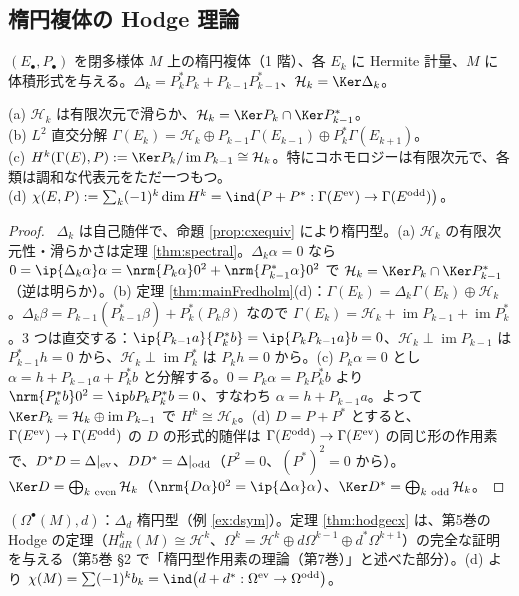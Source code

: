 \subsection{楕円複体の Hodge 理論}
$(E_\bullet,P_\bullet)$ を閉多様体 $M$ 上の楕円複体（1 階）、各 $E_k$ に Hermite 計量、$M$ に体積形式を与える。$\Delta_k=P_k^*P_k+P_{k-1}P_{k-1}^*$、$\mathcal H_k=\Ker\Delta_k$。
\begin{thm}\label{thm:hodgecx}
(a) $\mathcal H_k$ は有限次元で滑らか、$\mathcal H_k=\Ker P_k\cap\Ker P_{k-1}^*$。\\
(b) $L^2$ 直交分解 $\Gamma(E_k)=\mathcal H_k\oplus P_{k-1}\Gamma(E_{k-1})\oplus P_k^*\Gamma(E_{k+1})$。\\
(c) $H^k(\Gamma(E),P):=\Ker P_k/\operatorname{im}P_{k-1}\cong\mathcal H_k$。特にコホモロジーは有限次元で、各類は調和な代表元をただ一つもつ。\\
(d) $\chi(E,P):=\sum_k(-1)^k\dim H^k=\ind\bigl(P+P^*:\Gamma(E^{\rm ev})\to\Gamma(E^{\rm odd})\bigr)$。
\end{thm}
\begin{proof}
\tP\ $\Delta_k$ は自己随伴で、命題 \ref{prop:cxequiv} により楕円型。(a) $\mathcal H_k$ の有限次元性・滑らかさは定理 \ref{thm:spectral}。$\Delta_k\alpha=0$ なら $0=\ip{\Delta_k\alpha}\alpha=\nrm{P_k\alpha}0^2+\nrm{P_{k-1}^*\alpha}0^2$ で $\mathcal H_k=\Ker P_k\cap\Ker P_{k-1}^*$（逆は明らか）。(b) 定理 \ref{thm:mainFredholm}(d)：$\Gamma(E_k)=\Delta_k\Gamma(E_k)\oplus\mathcal H_k$。$\Delta_k\beta=P_{k-1}(P_{k-1}^*\beta)+P_k^*(P_k\beta)$ なので $\Gamma(E_k)=\mathcal H_k+\operatorname{im}P_{k-1}+\operatorname{im}P_k^*$。3 つは直交する：$\ip{P_{k-1}a}{P_k^*b}=\ip{P_kP_{k-1}a}b=0$、$\mathcal H_k\perp\operatorname{im}P_{k-1}$ は $P_{k-1}^*h=0$ から、$\mathcal H_k\perp\operatorname{im}P_k^*$ は $P_kh=0$ から。(c) $P_k\alpha=0$ とし $\alpha=h+P_{k-1}a+P_k^*b$ と分解する。$0=P_k\alpha=P_kP_k^*b$ より $\nrm{P_k^*b}0^2=\ip b{P_kP_k^*b}=0$、すなわち $\alpha=h+P_{k-1}a$。よって $\Ker P_k=\mathcal H_k\oplus\operatorname{im}P_{k-1}$ で $H^k\cong\mathcal H_k$。(d) $D=P+P^*$ とすると、$\Gamma(E^{\rm ev})\to\Gamma(E^{\rm odd})$ の $D$ の形式的随伴は $\Gamma(E^{\rm odd})\to\Gamma(E^{\rm ev})$ の同じ形の作用素で、$D^*D=\Delta|_{\rm ev}$、$DD^*=\Delta|_{\rm odd}$（$P^2=0$、$(P^*)^2=0$ から）。$\Ker D=\bigoplus_{k\ \rm even}\mathcal H_k$（$\nrm{D\alpha}0^2=\ip{\Delta\alpha}\alpha$）、$\Ker D^*=\bigoplus_{k\ \rm odd}\mathcal H_k$。
\end{proof}
\begin{ex}\label{ex:hodgeR}
$(\Omega^\bullet(M),d)$：$\Delta_d$ 楕円型（例 \ref{ex:dsym}）。定理 \ref{thm:hodgecx} は、第5巻の Hodge の定理（$H^k_{dR}(M)\cong\mathcal H^k$、$\Omega^k=\mathcal H^k\oplus d\Omega^{k-1}\oplus d^*\Omega^{k+1}$）の完全な証明を与える（第5巻 \S2 で「楕円型作用素の理論（第7巻）」と述べた部分）。(d) より $\chi(M)=\sum(-1)^kb_k=\ind\bigl(d+d^*:\Omega^{\rm ev}\to\Omega^{\rm odd}\bigr)$。
\end{ex}
